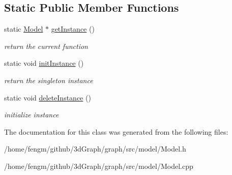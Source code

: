 \subsection*{Static Public Member Functions}
\begin{DoxyCompactItemize}
\item 
\mbox{\label{class_m_v_c_1_1_model_aa8fca93a73b58c9f3f4ceb8e3b0122c8}} 
static \mbox{\hyperlink{class_m_v_c_1_1_model}{Model}} $\ast$ \mbox{\hyperlink{class_m_v_c_1_1_model_aa8fca93a73b58c9f3f4ceb8e3b0122c8}{get\+Instance}} ()
\begin{DoxyCompactList}\small\item\em return the current function \end{DoxyCompactList}\item 
\mbox{\label{class_m_v_c_1_1_model_a37f3fc58ef8ea27c87db954be2dcdbc5}} 
static void \mbox{\hyperlink{class_m_v_c_1_1_model_a37f3fc58ef8ea27c87db954be2dcdbc5}{init\+Instance}} ()
\begin{DoxyCompactList}\small\item\em return the singleton instance \end{DoxyCompactList}\item 
\mbox{\label{class_m_v_c_1_1_model_a8deb0b7d28cbbc67b0ffb9084e76deaf}} 
static void \mbox{\hyperlink{class_m_v_c_1_1_model_a8deb0b7d28cbbc67b0ffb9084e76deaf}{delete\+Instance}} ()
\begin{DoxyCompactList}\small\item\em initialize instance \end{DoxyCompactList}\end{DoxyCompactItemize}


The documentation for this class was generated from the following files\+:\begin{DoxyCompactItemize}
\item 
/home/fengm/github/3d\+Graph/graph/src/model/Model.\+h\item 
/home/fengm/github/3d\+Graph/graph/src/model/Model.\+cpp\end{DoxyCompactItemize}
